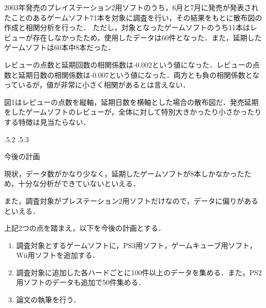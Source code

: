 \documentclass[uplatex]{jsarticle}
\makeatletter
\renewcommand{\section}{%
    \if@slide\clearpage\fi
    \@startsection{section}{1}{\z@}%
    {\Cvs \@plus.5\Cdp \@minus.2\Cdp}%
    {.5\Cvs \@plus.3\Cdp}%
    {\normalfont\raggedright}}
\makeatother
\begin{document}
2003年発売のプレイステーション2用ソフトのうち，6月と7月に発売が発表されたことのあるゲームソフト71本を対象に調査を行い，その結果をもとに散布図の作成と相関分析を行った．
ただし，対象となったゲームソフトのうち11本はレビューが存在しなかったため，使用したデータは60件となった．また，延期したゲームソフトは60本中8本だった．

レビューの点数と延期回数の相関係数は-0.002という値になった．レビューの点数と延期日数の相関係数は-0.007という値になった．両方とも負の相関係数となっているが，値が非常に小さく相関があるとは言えない．

図1はレビューの点数を縦軸，延期日数を横軸とした場合の散布図だ．発売延期をしたゲームソフトのレビューが，全体に対して特別大きかったり小さかったりする特徴は見当たらない．

\section{今後の計画}


現状，データ数がかなり少なく，延期したゲームソフトが8本しかなかったため，十分な分析ができていないといえる．

また，調査対象がプレステーション2用ソフトだけなので，データに偏りがあるといえる．

上記2つの点を踏まえ，以下を今後の計画とする．

\begin{enumerate}
\item 調査対象とするゲームソフトに，PS3用ソフト，ゲームキューブ用ソフト，Wii用ソフトを追加する．
\item 調査対象に追加した各ハードごとに100件以上のデータを集める．また，PS2用ソフトのデータも追加で50件集める．
\item 論文の執筆を行う．
\end{enumerate}


\end{document}
